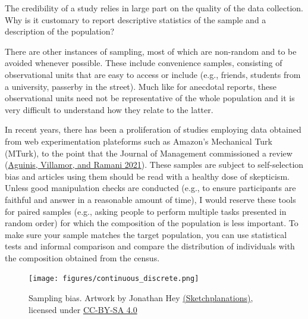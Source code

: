 \documentclass[
  11pt,
  letterpaper,
]{scrbook}
\theoremstyle{definition}
\theoremstyle{remark}
\begin{document}
\begin{tcolorbox}[enhanced jigsaw, breakable, toptitle=1mm, left=2mm, bottomrule=.15mm, colframe=quarto-callout-note-color-frame, colback=white, rightrule=.15mm, title=\textcolor{quarto-callout-note-color}{\faInfo}\hspace{0.5em}{Thinking outside the box}, opacityback=0, toprule=.15mm, titlerule=0mm, colbacktitle=quarto-callout-note-color!10!white, bottomtitle=1mm, arc=.35mm, coltitle=black, opacitybacktitle=0.6, leftrule=.75mm]

The credibility of a study relies in large part on the quality of the
data collection. Why is it customary to report descriptive statistics of
the sample and a description of the population?

\end{tcolorbox}

There are other instances of sampling, most of which are non-random and
to be avoided whenever possible. These include convenience samples,
consisting of observational units that are easy to access or include
(e.g., friends, students from a university, passerby in the street).
Much like for anecdotal reports, these observational units need not be
representative of the whole population and it is very difficult to
understand how they relate to the latter.

In recent years, there has been a proliferation of studies employing
data obtained from web experimentation plateforms such as Amazon's
Mechanical Turk (MTurk), to the point that the Journal of Management
commissioned a review (\protect\hyperlink{ref-Aguinis:2021}{Aguinis,
Villamor, and Ramani 2021}). These samples are subject to self-selection
bias and articles using them should be read with a healthy dose of
skepticism. Unless good manipulation checks are conducted (e.g., to
ensure participants are faithful and answer in a reasonable amount of
time), I would reserve these tools for paired samples (e.g., asking
people to perform multiple tasks presented in random order) for which
the composition of the population is less important. To make sure your
sample matches the target population, you can use statistical tests and
informal comparison and compare the distribution of individuals with the
composition obtained from the census.

\begin{figure}[ht!]

{\centering \texttt{[image: figures/continuous\_discrete.png]}

}

\caption{\label{fig-samplingbias}Sampling bias. Artwork by Jonathan Hey
\href{https://sketchplanations.com/sampling-bias}{(Sketchplanations)},
licensed under
\href{https://creativecommons.org/licenses/by-nc/4.0/}{CC-BY-SA 4.0}}

\end{figure}
\end{document}
